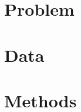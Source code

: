 \documentclass[12pt]{article}
\begin{document}


\section{Problem}



\section{Data}


\section{Methods}

\end{document}
